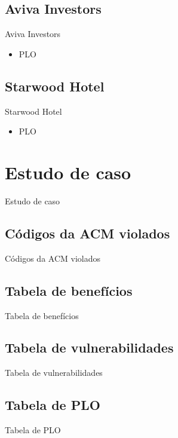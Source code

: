 \documentclass[dvipdfm]{beamer}
\begin{document}
\subsection{Aviva Investors}
\begin{frame}{Aviva Investors}
	\begin{itemize}
		\item PLO
	\end{itemize}
\end{frame}

\subsection{Starwood Hotel}
\begin{frame}{Starwood Hotel}
	\begin{itemize}
		\item PLO
	\end{itemize}
\end{frame}

\section{Estudo de caso}
\begin{frame}{Estudo de caso}

\end{frame}

\subsection{Códigos da ACM violados}
\begin{frame}{Códigos da ACM violados}
\end{frame}

\subsection{Tabela de benefícios}
\begin{frame}{Tabela de benefícios}
\end{frame}

\subsection{Tabela de vulnerabilidades}
\begin{frame}{Tabela de vulnerabilidades}
\end{frame}

\subsection{Tabela de PLO}
\begin{frame}{Tabela de PLO}
\end{frame}
\end{document}
